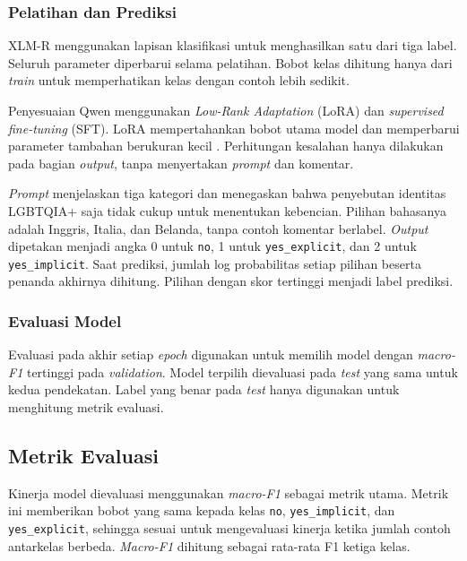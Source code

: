 \documentclass[11pt]{article}
\begin{document}
\subsubsection{Pelatihan dan Prediksi}
XLM-R menggunakan lapisan klasifikasi untuk menghasilkan satu dari tiga label. Seluruh parameter diperbarui selama pelatihan. Bobot kelas dihitung hanya dari \textit{train} untuk memperhatikan kelas dengan contoh lebih sedikit.

Penyesuaian Qwen menggunakan \textit{Low-Rank Adaptation} (LoRA) dan \textit{supervised fine-tuning} (SFT). LoRA mempertahankan bobot utama model dan memperbarui parameter tambahan berukuran kecil \citep{hu-etal-2021-lora}. Perhitungan kesalahan hanya dilakukan pada bagian \textit{output}, tanpa menyertakan \textit{prompt} dan komentar.

\textit{Prompt} menjelaskan tiga kategori dan menegaskan bahwa penyebutan identitas LGBTQIA+ saja tidak cukup untuk menentukan kebencian. Pilihan bahasanya adalah Inggris, Italia, dan Belanda, tanpa contoh komentar berlabel. \textit{Output} dipetakan menjadi angka 0 untuk \texttt{no}, 1 untuk \texttt{yes\_explicit}, dan 2 untuk \texttt{yes\_implicit}. Saat prediksi, jumlah log probabilitas setiap pilihan beserta penanda akhirnya dihitung. Pilihan dengan skor tertinggi menjadi label prediksi.

\subsubsection{Evaluasi Model}
Evaluasi pada akhir setiap \textit{epoch} digunakan untuk memilih model dengan \textit{macro-F1} tertinggi pada \textit{validation}. Model terpilih dievaluasi pada \textit{test} yang sama untuk kedua pendekatan. Label yang benar pada \textit{test} hanya digunakan untuk menghitung metrik evaluasi.

\subsection{Metrik Evaluasi}
Kinerja model dievaluasi menggunakan \textit{macro-F1} sebagai metrik utama. Metrik ini memberikan bobot yang sama kepada kelas \texttt{no}, \texttt{yes\_implicit}, dan \texttt{yes\_explicit}, sehingga sesuai untuk mengevaluasi kinerja ketika jumlah contoh antarkelas berbeda. \textit{Macro-F1} dihitung sebagai rata-rata F1 ketiga kelas.
\end{document}
